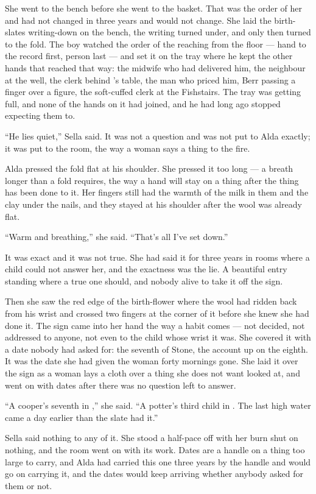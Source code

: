 She went to the bench before she went to the basket. That was the order of her and had not changed in three years and would not change. She laid the birth-slates writing-down on the bench, the writing turned under, and only then turned to the fold. The boy watched the order of the reaching from the floor --- hand to the record first, person last --- and set it on the tray where he kept the other hands that reached that way: the midwife who had delivered him, the neighbour at the well, the clerk behind 's table, the man who priced him, Berr passing a finger over a figure, the soft-cuffed clerk at the Fishstairs. The tray was getting full, and none of the hands on it had joined, and he had long ago stopped expecting them to.

“He lies quiet,” Sella said. It was not a question and was not put to Alda exactly; it was put to the room, the way a woman says a thing to the fire.

Alda pressed the fold flat at his shoulder. She pressed it too long --- a breath longer than a fold requires, the way a hand will stay on a thing after the thing has been done to it. Her fingers still had the warmth of the milk in them and the clay under the nails, and they stayed at his shoulder after the wool was already flat.

“Warm and breathing,” she said. “That's all I've set down.”

It was exact and it was not true. She had said it for three years in rooms where a child could not answer her, and the exactness was the lie. A beautiful entry standing where a true one should, and nobody alive to take it off the sign.

Then she saw the red edge of the birth-flower where the wool had ridden back from his wrist and crossed two fingers at the corner of it before she knew she had done it. The sign came into her hand the way a habit comes --- not decided, not addressed to anyone, not even to the child whose wrist it was. She covered it with a date nobody had asked for: the seventh of Stone, the account up on the eighth. It was the date she had given the woman forty mornings gone. She laid it over the sign as a woman lays a cloth over a thing she does not want looked at, and went on with dates after there was no question left to answer.

“A cooper's seventh in ,” she said. “A potter's third child in . The last high water came a day earlier than the slate had it.”

Sella said nothing to any of it. She stood a half-pace off with her burn shut on nothing, and the room went on with its work. Dates are a handle on a thing too large to carry, and Alda had carried this one three years by the handle and would go on carrying it, and the dates would keep arriving whether anybody asked for them or not.

